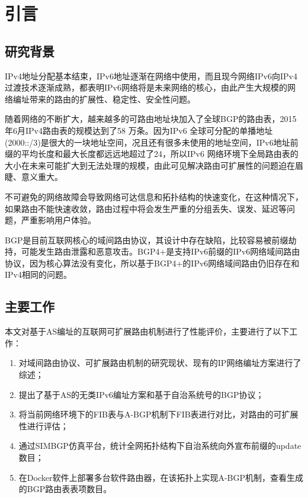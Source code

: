 

\chapter{引言}
\label{cha:intro}

\section{研究背景}
IPv4地址分配基本结束，IPv6地址逐渐在网络中使用，而且现今网络IPv6向IPv4过渡技术逐渐成熟，都表明IPv6网络将是未来网络的核心，由此产生大规模的网络编址带来的路由的扩展性、稳定性、安全性问题。

随着网络的不断扩大，越来越多的可路由地址块加入了全球BGP的路由表，2015年6月IPv4路由表的规模达到了58 万条\cite{bgptabledata}。因为IPv6 全球可分配的单播地址(2000::/3)是很大的一块地址空间，况且还有很多未使用的地址空间，IPv6地址前缀的平均长度和最大长度都远远地超过了24，所以IPv6 网络环境下全局路由表的大小在未来可能扩大到无法处理的规模，由此可见解决路由可扩展性的问题迫在眉睫、意义重大。

不可避免的网络故障会导致网络可达信息和拓扑结构的快速变化，在这种情况下，如果路由不能快速收敛，路由过程中将会发生严重的分组丢失、误发、延迟等问题，严重影响用户体验。

BGP是目前互联网核心的域间路由协议，其设计中存在缺陷，比较容易被前缀劫持，可能发生路由泄露和恶意攻击。BGP4+是支持IPv6前缀的IPv6网络域间路由协议，因为核心算法没有变化，所以基于BGP4+的IPv6网络域间路由仍旧存在和IPv4相同的问题。

\section{主要工作}
本文对基于AS编址的互联网可扩展路由机制进行了性能评价，主要进行了以下工作：

\begin{enumerate}
\item 对域间路由协议、可扩展路由机制的研究现状、现有的IP网络编址方案进行了综述；
\item 提出了基于AS的无类IPv6编址方案和基于自治系统号的BGP协议；
\item 将当前网络环境下的FIB表与A-BGP机制下FIB表进行对比，对路由的可扩展性进行评估；
\item 通过SIMBGP仿真平台，统计全网拓扑结构下自治系统向外宣布前缀的update数目；
\item 在Docker软件上部署多台软件路由器，在该拓扑上实现A-BGP机制，查看生成的BGP路由表表项数目。
\end{enumerate}

